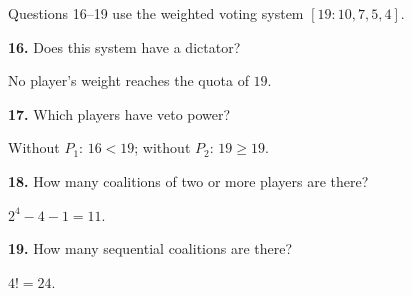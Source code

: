\documentclass[12pt]{ximera}
\begin{document}
\begin{problem}
Questions 16--19 use the weighted voting system $[19:10,7,5,4]$.

\begin{prompt}
\textbf{16.} Does this system have a dictator?
\begin{multipleChoice}
\end{multipleChoice}
\begin{feedback}
No player's weight reaches the quota of $19$.
\end{feedback}
\end{prompt}

\begin{prompt}
\textbf{17.} Which players have veto power?
\begin{multipleChoice}
\end{multipleChoice}
\begin{feedback}
Without $P_1$: $16<19$; without $P_2$: $19\ge19$.
\end{feedback}
\end{prompt}

\begin{prompt}
\textbf{18.} How many coalitions of two or more players are there?
\begin{multipleChoice}
\end{multipleChoice}
\begin{feedback}
$2^4-4-1=11$.
\end{feedback}
\end{prompt}

\begin{prompt}
\textbf{19.} How many sequential coalitions are there?
\begin{multipleChoice}
\end{multipleChoice}
\begin{feedback}
$4!=24$.
\end{feedback}
\end{prompt}
\end{problem}
\end{document}

